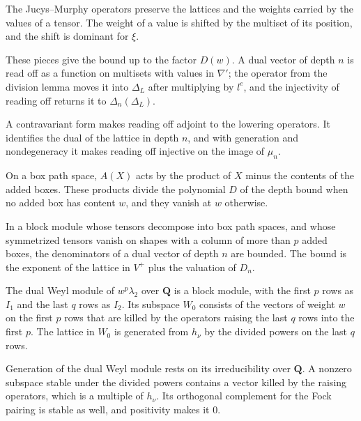 The Jucys--Murphy operators preserve the lattices and the weights carried by the values of a tensor. The
weight of a value is shifted by the multiset of its position, and the shift is dominant for $\xi$.

These pieces give the bound up to the factor $D(w)$. A dual vector of depth $n$ is read off as a function on
multisets with values in $\nabla'$; the operator from the division lemma moves it into $\Delta_L$ after
multiplying by $l^e$, and the injectivity of reading off returns it to $\Delta_n(\Delta_L)$.

A contravariant form makes reading off adjoint to the lowering operators. It identifies the dual of the
lattice in depth $n$, and with generation and nondegeneracy it makes reading off injective on the image of
$\mu_n$.

On a box path space, $A(X)$ acts by the product of $X$ minus the contents of the added boxes. These products
divide the polynomial $D$ of the depth bound when no added box has content $w$, and they vanish at $w$ otherwise.

In a block module whose tensors decompose into box path spaces, and whose symmetrized tensors vanish on
shapes with a column of more than $p$ added boxes, the denominators of a dual vector of depth $n$ are
bounded. The bound is the exponent of the lattice in $V^+$ plus the valuation of $D_n$.

The dual Weyl module of $w^p\lambda_2$ over $\mathbf Q$ is a block module, with the first $p$ rows as
$I_1$ and the last $q$ rows as $I_2$. Its subspace $W_0$ consists of the vectors of weight $w$ on the first
$p$ rows that are killed by the operators raising the last $q$ rows into the first $p$. The lattice in
$W_0$ is generated from $h_\nu$ by the divided powers on the last $q$ rows.

Generation of the dual Weyl module rests on its irreducibility over $\mathbf Q$. A nonzero subspace
stable under the divided powers contains a vector killed by the raising operators, which is a multiple of
$h_\nu$. Its orthogonal complement for the Fock pairing is stable as well, and positivity makes it $0$.

